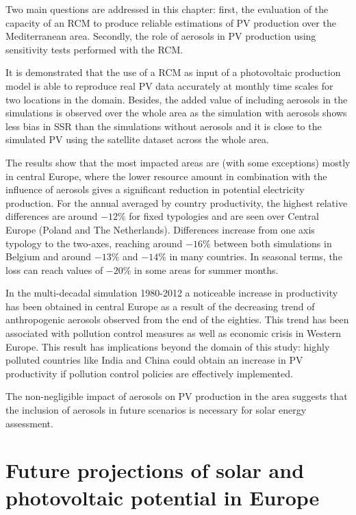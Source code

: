 Two main questions are addressed in this chapter: first, the evaluation of the capacity of an RCM to produce reliable estimations of PV production over the Mediterranean area. Secondly, the role of aerosols in PV production using sensitivity tests performed with the RCM. 

It is demonstrated that the use of a RCM as input of a photovoltaic production model is able to reproduce real PV data accurately at monthly time scales for two locations in the domain. Besides, the added value of including aerosols in the simulations is observed over the whole area as the simulation with aerosols shows less bias in SSR than the simulations without aerosols and it is close to the simulated PV using the satellite dataset across the whole area. 

The results show that the most impacted areas are (with some exceptions) mostly in central Europe, where the lower resource amount in combination with the influence of aerosols gives a significant reduction in potential electricity production. For the annual averaged by country productivity, the highest relative differences are around $-12\%$ for fixed typologies and are seen over Central Europe (Poland and The Netherlands). Differences increase from one axis typology to the two-axes, reaching around $-16\%$ between both simulations in Belgium and around $-13\%$ and $-14\%$ in many countries. In seasonal terms, the loss can reach values of $-20\%$ in some areas for summer months.

In the multi-decadal simulation 1980-2012 a noticeable increase in productivity has been obtained in central Europe as a result of the decreasing trend of anthropogenic aerosols observed from the end of the eighties. This trend has been associated with pollution control measures as well as economic crisis in Western Europe. This result has implications beyond the domain of this study: highly polluted countries like India and China could obtain an increase in PV productivity if pollution control policies are effectively implemented.

The non-negligible impact of aerosols on PV production in the area suggests that the inclusion of aerosols in future scenarios is necessary for solar energy assessment.

\chapter{Future projections of solar and photovoltaic  potential  in Europe\label{cha:projections}}


